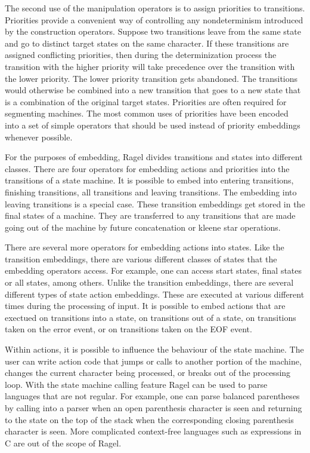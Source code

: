 \documentclass[letterpaper,11pt,oneside]{book}
\begin{document}
The second use of the manipulation operators is to assign priorities to
transitions. Priorities provide a convenient way of controlling any
nondeterminism introduced by the construction operators. Suppose two
transitions leave from the same state and go to distinct target states on the
same character. If these transitions are assigned conflicting priorities, then
during the determinization process the transition with the higher priority will
take precedence over the transition with the lower priority. The lower priority
transition gets abandoned. The transitions would otherwise be combined into a new
transition that goes to a new state that is a combination of the original
target states. Priorities are often required for segmenting machines. The most
common uses of priorities have been encoded into a set of simple operators
that should be used instead of priority embeddings whenever possible.

For the purposes of embedding, Ragel divides transitions and states into
different classes. There are four operators for embedding actions and
priorities into the transitions of a state machine. It is possible to embed
into entering transitions, finishing transitions, all transitions and leaving
transitions. The embedding into leaving transitions is a special case.
These transition embeddings get stored in the final states of a machine.  They
are transferred to any transitions that are made going out of the machine by
future concatenation or kleene star operations.

There are several more operators for embedding actions into states. Like the
transition embeddings, there are various different classes of states that the
embedding operators access. For example, one can access start states, final
states or all states, among others. Unlike the transition embeddings, there are
several different types of state action embeddings. These are executed at
various different times during the processing of input. It is possible to embed
actions that are exectued on transitions into a state, on transitions out of a
state, on transitions taken on the error event, or on transitions taken on the
EOF event.

Within actions, it is possible to influence the behaviour of the state machine.
The user can write action code that jumps or calls to another portion of the
machine, changes the current character being processed, or breaks out of the
processing loop. With the state machine calling feature Ragel can be used to
parse languages that are not regular. For example, one can parse balanced
parentheses by calling into a parser when an open parenthesis character is seen
and returning to the state on the top of the stack when the corresponding
closing parenthesis character is seen. More complicated context-free languages
such as expressions in C are out of the scope of Ragel. 
\end{document}
